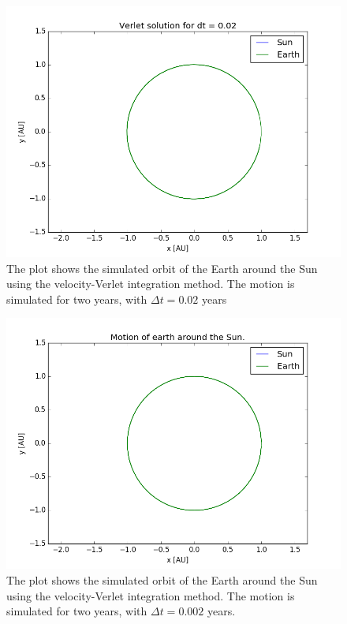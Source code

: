 \begin{figure}[H]
\includegraphics[scale=0.7]{figures/verlet_002}
\caption{The plot shows the simulated orbit of the Earth around the Sun using the velocity-Verlet integration method. The motion is simulated for two years, with $\Delta t = 0.02$ years}
\end{figure}

\begin{figure}[H]
\includegraphics[scale=0.7]{figures/earth_sun_verlet}
\caption{The plot shows the simulated orbit of the Earth around the Sun using the velocity-Verlet integration method. The motion is simulated for two years, with $\Delta t = 0.002$ years.}
\end{figure}

